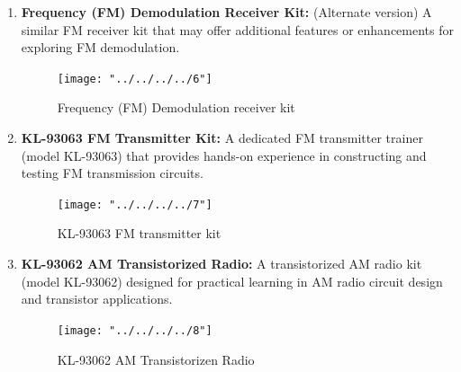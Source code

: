 \documentclass[a4paper,12pt]{article}
\begin{document}
\begin{enumerate}
\begin{figure}[H]
			\end{figure}
			
			
			
			
			
			
			
			
			
			
			\item \textbf{Frequency (FM) Demodulation Receiver Kit:} (Alternate version) A similar FM receiver kit that may offer additional features or enhancements for exploring FM demodulation.
				\begin{figure}[H]
				\centering
				\texttt{[image: "../../../../6"]}
				\caption{Frequency (FM) Demodulation receiver kit}
				
			\end{figure}
			
			
			
			
			
			
			
			
			
			\item \textbf{KL-93063 FM Transmitter Kit:} A dedicated FM transmitter trainer (model KL-93063) that provides hands-on experience in constructing and testing FM transmission circuits.
			
			\begin{figure}[H]
				\centering
				\texttt{[image: "../../../../7"]}
				\caption{KL-93063 FM transmitter kit}
				
			\end{figure}
			
			
			
			
			
			
			
			
			
			
			
			
			\item \textbf{KL-93062 AM Transistorized Radio:} A transistorized AM radio kit (model KL-93062) designed for practical learning in AM radio circuit design and transistor applications.
			\begin{figure}[H]
				\centering
				\texttt{[image: "../../../../8"]}
				\caption{KL-93062 AM Transistorizen Radio}
				
			\end{figure}
			
			
			
			
			
			
			
			
			
			
			

\end{enumerate}
\end{document}
